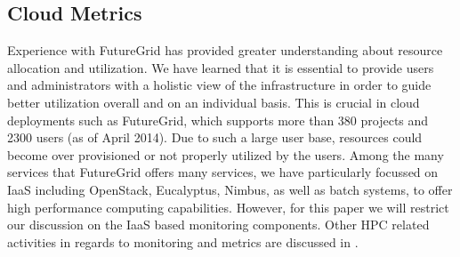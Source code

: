 \documentclass{tex/sig-alternate-2013}
\begin{document}

\subsection{Cloud Metrics}

Experience with FutureGrid has provided greater understanding about
resource allocation and utilization. We have learned that it is
essential to provide users and administrators with a holistic view of
the infrastructure in order to guide better utilization overall and on
an individual basis. This is crucial in cloud deployments such as
FutureGrid, which supports more than 380 projects and 2300 users (as
of April 2014). Due to such a large user base, resources could become
over provisioned or not properly utilized by the users. Among the many
services that FutureGrid offers many services, we have particularly
focussed on IaaS including OpenStack, Eucalyptus, Nimbus, as well as
batch systems, to offer high performance computing capabilities.
However, for this paper we will restrict our discussion on the IaaS
based monitoring components.  Other HPC related activities in regards
to monitoring and metrics are discussed in \cite{las13xdmod}.
\end{document}
